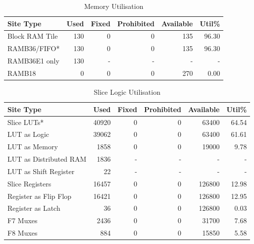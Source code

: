 \begin{table}
    \centering
    \caption{Memory Utilisation}
    \begin{tabular}{|l|r|r|r|r|r|}
        \toprule
        Site Type      & Used & Fixed & Prohibited & Available & Util\% \\
        \midrule
        Block RAM Tile &  130 &     0 &          0 &       135 & 96.30 \\
        RAMB36/FIFO*   &  130 &     0 &          0 &       135 & 96.30 \\
        RAMB36E1 only  &  130 &     - &          - &         - &    -  \\
        RAMB18         &    0 &     0 &          0 &       270 &  0.00 \\
        \bottomrule
    \end{tabular}
\end{table}

\begin{table}
    \centering
    \caption{Slice Logic Utilisation}
    \begin{tabular}{|l|r|r|r|r|r|}
        \toprule
        Site Type                 & Used & Fixed & Prohibited & Available & Util\% \\
        \midrule
        Slice LUTs*               & 40920 &     0 &          0 &     63400 & 64.54 \\
        LUT as Logic              & 39062 &     0 &          0 &     63400 & 61.61 \\
        LUT as Memory             &  1858 &     0 &          0 &     19000 &  9.78 \\
        LUT as Distributed RAM    &  1836 &     - &          - &         - &    -  \\
        LUT as Shift Register     &    22 &     - &          - &         - &    -  \\
        Slice Registers           & 16457 &     0 &          0 &    126800 & 12.98 \\
        Register as Flip Flop     & 16421 &     0 &          0 &    126800 & 12.95 \\
        Register as Latch         &    36 &     0 &          0 &    126800 &  0.03 \\
        F7 Muxes                  &  2436 &     0 &          0 &     31700 &  7.68 \\
        F8 Muxes                  &   884 &     0 &          0 &     15850 &  5.58 \\
        \bottomrule
    \end{tabular}
\end{table}


